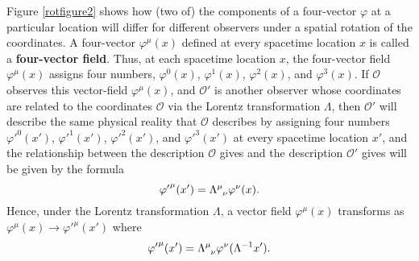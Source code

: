 	Figure \ref{rotfigure2} shows how (two of) the components of a four-vector $\varphi$ at a particular location will differ for different observers under a spatial rotation of the coordinates. A four-vector $\varphi^\mu(x)$ defined at every spacetime location $x$ is called a \textbf{four-vector field}. Thus,  at each spacetime location $x$, the four-vector field $\varphi^\mu(x)$ assigns four numbers, $\varphi^0(x)$, $\varphi^1(x)$, $\varphi^2(x)$, and $\varphi^3(x)$. If $\mathcal{O}$ observes this vector-field $\varphi^\mu(x)$, and $\mathcal{O}'$ is another observer whose coordinates are related to the coordinates $\mathcal{O}$ via the Lorentz transformation $\Lambda$, then $\mathcal{O}'$ will describe the same physical reality that $\mathcal{O}$ describes by assigning four numbers ${\varphi'}^0(x')$, ${\varphi'}^1(x')$, ${\varphi'}^2(x')$, and ${\varphi'}^3(x')$ at every spacetime location $x'$, and the relationship between the description $\mathcal{O}$ gives and the  description $\mathcal{O}'$ gives will be given by the formula
	$${\varphi'}^\mu(x')=\Lambda\indices{^\mu_\nu}\varphi^\nu(x).$$
	Hence, under the Lorentz transformation $\Lambda$,  a vector field $\varphi^\mu(x)$ transforms as ${\varphi}^\mu(x)\rightarrow {\varphi'}^\mu(x')$ where
	\begin{equation}\label{lorentzvector}
	{\varphi'}^\mu(x')=\Lambda\indices{^\mu_\nu}\varphi^\nu(\Lambda^{-1}x').
	\end{equation} 



